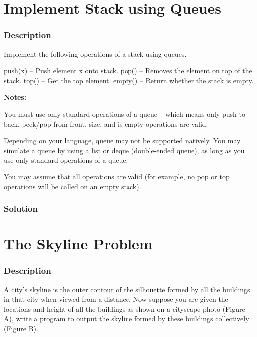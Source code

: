 \newpage

\section{Implement Stack using Queues} %

\subsubsection{Description}
Implement the following operations of a stack using queues.
\begin{Code}
push(x) -- Push element x onto stack.
pop() -- Removes the element on top of the stack.
top() -- Get the top element.
empty() -- Return whether the stack is empty.
\end{Code}

\textbf{Notes:}

You must use only standard operations of a queue -- which means only push to back, peek/pop from front, size, and is empty operations are valid.

Depending on your language, queue may not be supported natively. You may simulate a queue by using a list or deque (double-ended queue), as long as you use only standard operations of a queue.

You may assume that all operations are valid (for example, no pop or top operations will be called on an empty stack).

\subsubsection{Solution}

\begin{Code}

\end{Code}

\newpage

\section{The Skyline Problem} %

\subsubsection{Description}
A city's skyline is the outer contour of the silhouette formed by all the buildings in that city when viewed from a distance. Now suppose you are given the locations and height of all the buildings as shown on a cityscape photo (Figure A), write a program to output the skyline formed by these buildings collectively (Figure B).

